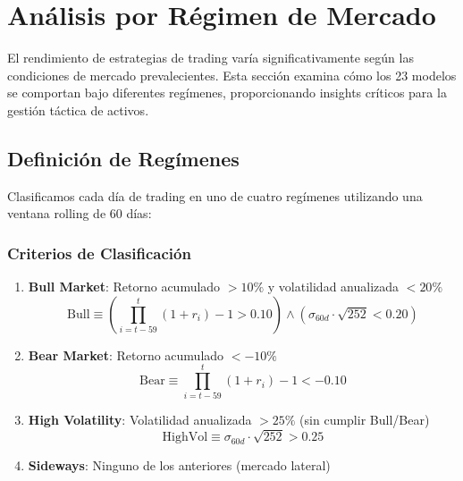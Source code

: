 
\section{An\'alisis por R\'egimen de Mercado}
\label{sec:regime_analysis}

El rendimiento de estrategias de trading var\'ia significativamente seg\'un las condiciones de mercado prevalecientes. Esta secci\'on examina c\'omo los 23 modelos se comportan bajo diferentes reg\'imenes, proporcionando insights cr\'iticos para la gesti\'on t\'actica de activos.

\subsection{Definici\'on de Reg\'imenes}
\label{subsec:regime_definition}

Clasificamos cada d\'ia de trading en uno de cuatro reg\'imenes utilizando una ventana rolling de 60 d\'ias:

\subsubsection{Criterios de Clasificaci\'on}

\begin{enumerate}
    \item \textbf{Bull Market}: Retorno acumulado $> 10\%$ y volatilidad anualizada $< 20\%$
    \begin{equation}
    \text{Bull} \equiv \left(\prod_{i=t-59}^{t}(1+r_i) - 1 > 0.10\right) \land \left(\sigma_{60d} \cdot \sqrt{252} < 0.20\right)
    \end{equation}

    \item \textbf{Bear Market}: Retorno acumulado $< -10\%$
    \begin{equation}
    \text{Bear} \equiv \prod_{i=t-59}^{t}(1+r_i) - 1 < -0.10
    \end{equation}

    \item \textbf{High Volatility}: Volatilidad anualizada $> 25\%$ (sin cumplir Bull/Bear)
    \begin{equation}
    \text{HighVol} \equiv \sigma_{60d} \cdot \sqrt{252} > 0.25
    \end{equation}

    \item \textbf{Sideways}: Ninguno de los anteriores (mercado lateral)
\end{enumerate}

